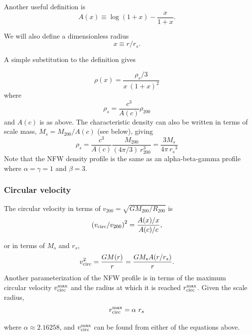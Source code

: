 Another useful definition is \[
A(x) \equiv \log (1+x) - \frac{x}{1+x}.
\]

We will also define a dimensionless radius \[
x \equiv r/r_s.
\]

A simple substitution to the definition gives

\[
\rho(x) =  \frac{\rho_s/3}{x\ (1+x)^2}
\] where \[
\rho_s = \frac{c^3}{A(c)} \rho_{200}
\] and \(A(c)\) is as above. The characteristic density can also be
written in terms of scale mass, \(M_s = M_{200}/{A(c)}\) (see below),
giving \[
\rho_s = \frac{c^3}{A(c)} \frac{M_{200}}{(4\pi/3)\ r_{200}^3}  = \frac{3M_s}{4\pi\, {r_s}^3}
\] Note that the NFW density profile is the same as an alpha-beta-gamma
profile where \(\alpha=\gamma=1\) and \(\beta =3\).

\subsubsection{Circular velocity}\label{circular-velocity}

The circular velocity in terms of
\(v_{200} = \sqrt{G M_{200} / R_{200}}\) is \[
\left(v_{\rm circ}/v_{200}\right)^2 = \frac{A(x)/x}{A(c)/c},
\]

or in terms of \(M_s\) and \(r_s\), \[
v_{\rm circ}^2 = \frac{G M(r)}{r} = \frac{G M_s A(r/r_s)}{r}.
\] Another parameterization of the NFW profile is in terms of the
maximum circular velocity \(v_{\rm circ}^{\rm max}\) and the radius at
which it is reached \(r_{\rm circ}^{\rm max}\). Given the scale radius,
\[
r_{\rm circ}^{\rm max} = \alpha\ r_s
\]

where \(\alpha\approx2.16258\), and \(v_{\rm circ}^{\rm max}\) can be
found from either of the equations above.
